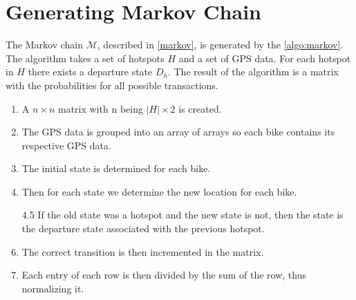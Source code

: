 \section{Generating Markov Chain}\label{sec:generatemarkov}
The Markov chain $\mathcal{M}$, described in \cref{markov}, is generated by the \cref{algo:markov}.
The algorithm takes a set of hotspots $H$ and a set of GPS data. For each hotspot in $H$ there exists a departure state $D_h$.
The result of the algorithm is a matrix with the probabilities for all possible transactions.

\begin{enumerate}
\item A $n \times n$ matrix with n being $|H| \times 2$ is created.
\item The GPS data is grouped into an array of arrays so each bike contains its respective GPS data.
\item The initial state is determined for each bike.
\item Then for each state we determine the new location for each bike.
\item[4.5] If the old state was a hotspot and the new state is not, then the state is the departure state associated with the previous hotspot.
\item The correct transition is then incremented in the matrix.
\item Each entry of each row is then divided by the sum of the row, thus normalizing it.
\end{enumerate}